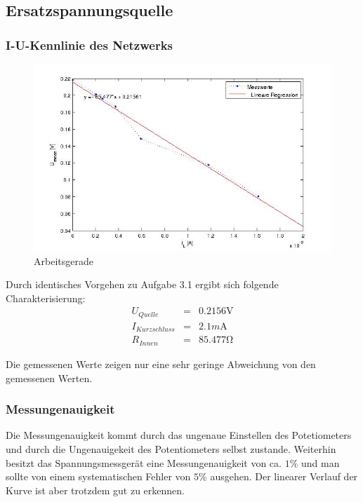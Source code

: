 \documentclass[10pt]{report}
\begin{document}
        \subsection{Ersatzspannungsquelle}
        \subsubsection{I-U-Kennlinie des Netzwerks}
        \begin{center}
            \begin{figure}[H]
              \includegraphics[width=\textwidth]{ErsatzspannungsQuelle.jpg}
              \caption{Arbeitsgerade}
            \end{figure}
        \end{center}

        Durch identisches Vorgehen zu Aufgabe 3.1 ergibt sich folgende
        Charakterisierung:
        \begin{eqnarray*}
            U_{Quelle} &=& 0.2156\si{\volt}\\
            I_{Kurzschluss} &=& 2.1\si{m\ampere}\\
            R_{Innen} &=& 85.477\si{\ohm}
        \end{eqnarray*}

		\vspace{0.5cm}

		Die gemessenen Werte zeigen nur eine sehr geringe Abweichung von den gemessenen
        Werten.



        \subsubsection{Messungenauigkeit}
        Die Messungenauigkeit kommt durch das ungenaue Einstellen des Potetiometers
        und durch die Ungenauigekeit des Potentiometers selbst zustande. Weiterhin besitzt
		das Spannungsmessgerät eine Messungenauigkeit von ca. $1\%$ und man sollte von einem
		systematischen Fehler von $5\%$ ausgehen. Der linearer Verlauf der Kurve ist aber
		trotzdem gut zu erkennen.
\end{document}
